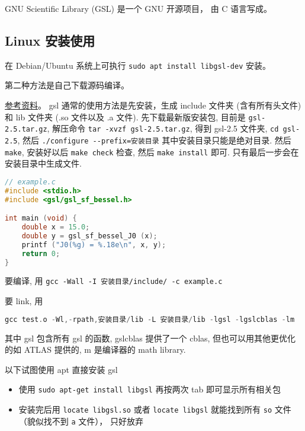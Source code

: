 
\begin{issues}
\issueDraft
\issueMissDepend
\end{issues}

GNU Scientific Library (GSL) 是一个 GNU 开源项目， 由 C 语言写成。

\subsection{Linux 安装使用}
在 Debian/Ubuntu 系统上可执行 \verb|sudo apt install libgsl-dev| 安装。

第二种方法是自己下载源码编译。

\href{https://coral.ise.lehigh.edu/jild13/2016/07/11/hello/}{参考资料}。 gsl 通常的使用方法是先安装，生成 include 文件夹 (含有所有头文件) 和 lib 文件夹 (.so 文件以及 .a 文件). 先下载最新版安装包, 目前是 \verb`gsl-2.5.tar.gz`, 解压命令 \verb`tar -xvzf gsl-2.5.tar.gz`, 得到 gsl-2.5 文件夹, \verb`cd gsl-2.5`, 然后 \verb`./configure --prefix=安装目录` 其中安装目录只能是绝对目录. 然后 \verb`make`, 安装好以后 \verb`make check` 检查, 然后 \verb`make install` 即可. 只有最后一步会在安装目录中生成文件.

\begin{lstlisting}[language=cpp]
// example.c
#include <stdio.h>
#include <gsl/gsl_sf_bessel.h>

int main (void) {
    double x = 15.0;
    double y = gsl_sf_bessel_J0 (x);
    printf ("J0(%g) = %.18e\n", x, y);
    return 0;
}
\end{lstlisting}

要编译, 用 \verb|gcc -Wall -I 安装目录/include/ -c example.c|

要 link, 用
\begin{lstlisting}[language=cpp]
gcc test.o -Wl,-rpath,安装目录/lib -L 安装目录/lib -lgsl -lgslcblas -lm
\end{lstlisting}
其中 gsl 包含所有 gsl 的函数, gslcblas 提供了一个 cblas, 但也可以用其他更优化的如 ATLAS 提供的, m 是编译器的 math library.

以下试图使用 apt 直接安装 gsl
\begin{itemize}
\item 使用 \verb`sudo apt-get install libgsl` 再按两次 tab 即可显示所有相关包
\item 安装完后用 \verb`locate libgsl.so` 或者 \verb`locate libgsl` 就能找到所有 \verb`so` 文件（貌似找不到 \verb`a` 文件）， 只好放弃
\end{itemize}

